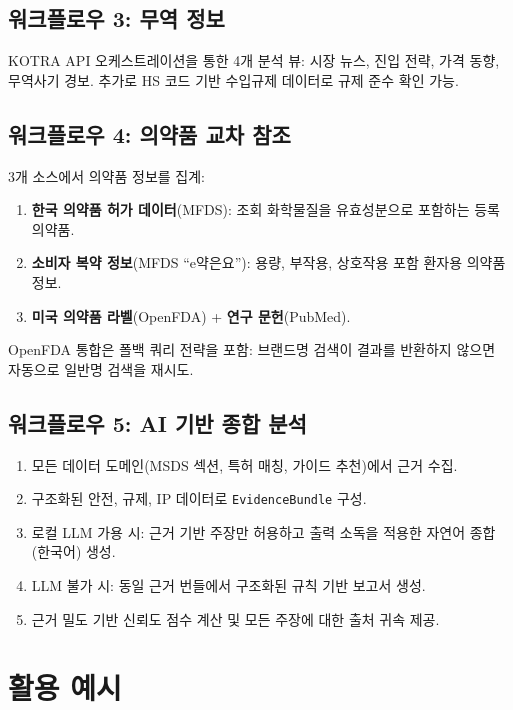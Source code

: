 \documentclass[preprint,12pt]{elsarticle}
\begin{document}
\subsection{워크플로우 3: 무역 정보}

KOTRA API 오케스트레이션을 통한 4개 분석 뷰: 시장 뉴스, 진입 전략, 가격 동향, 무역사기 경보. 추가로 HS 코드 기반 수입규제 데이터로 규제 준수 확인 가능.

\subsection{워크플로우 4: 의약품 교차 참조}

3개 소스에서 의약품 정보를 집계:
\begin{enumerate}
  \item \textbf{한국 의약품 허가 데이터}(MFDS): 조회 화학물질을 유효성분으로 포함하는 등록 의약품.
  \item \textbf{소비자 복약 정보}(MFDS ``e약은요''): 용량, 부작용, 상호작용 포함 환자용 의약품 정보.
  \item \textbf{미국 의약품 라벨}(OpenFDA) + \textbf{연구 문헌}(PubMed).
\end{enumerate}

OpenFDA 통합은 폴백 쿼리 전략을 포함: 브랜드명 검색이 결과를 반환하지 않으면 자동으로 일반명 검색을 재시도.

\subsection{워크플로우 5: AI 기반 종합 분석}

\begin{enumerate}
  \item 모든 데이터 도메인(MSDS 섹션, 특허 매칭, 가이드 추천)에서 근거 수집.
  \item 구조화된 안전, 규제, IP 데이터로 \texttt{EvidenceBundle} 구성.
  \item 로컬 LLM 가용 시: 근거 기반 주장만 허용하고 출력 소독을 적용한 자연어 종합(한국어) 생성.
  \item LLM 불가 시: 동일 근거 번들에서 구조화된 규칙 기반 보고서 생성.
  \item 근거 밀도 기반 신뢰도 점수 계산 및 모든 주장에 대한 출처 귀속 제공.
\end{enumerate}

\section{활용 예시}
\label{sec:examples}
\end{document}
